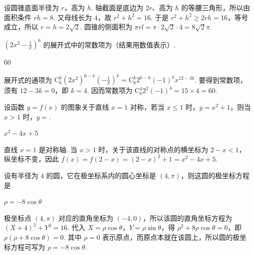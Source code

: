 \begin{solution}
设圆锥底面半径为 \(r\)，高为 \(h\). 轴截面是底边为 \(2r\)、高为 \(h\) 的等腰三角形，所以由面积条件 \(rh=8\). 又母线长为 \(4\)，故 \(r^2+h^2=16\). 于是
\(r^2+h^2\geqslant2rh=16\)，等号成立，所以 \(r=h=2\sqrt2\). 圆锥的侧面积为 \(\pi rl=\pi\cdot2\sqrt2\cdot4=8\sqrt2\pi\).
\end{solution}

\begin{problem}
\(\left(2x^2 - \frac{1}{x}\right)^6\) 的展开式中的常数项为\fillinblank{}（结果用数值表示）.
\end{problem}

\begin{answer}
\(60\)
\end{answer}

\begin{solution}
展开式的通项为
\(\displaystyle\mathrm C_6^k(2x^2)^{6-k}\left(-\frac1x\right)^k=\mathrm C_6^k2^{6-k}(-1)^kx^{12-3k}\). 要得到常数项，须有 \(12-3k=0\)，即 \(k=4\). 因而常数项为
\(\displaystyle\mathrm C_6^4 2^2(-1)^4=15\times4=60\).
\end{solution}

\begin{problem}
设函数 \(y = f(x)\) 的图象关于直线 \(x = 1\) 对称，若当 \(x \leqslant 1\) 时，\(y = x^2 + 1\)，则当 \(x > 1\) 时，\(y = \)\fillinblank{}.
\end{problem}

\begin{answer}
\(x^2 - 4x + 5\)
\end{answer}

\begin{solution}
直线 \(x=1\) 是对称轴. 当 \(x>1\) 时，关于该直线的对称点的横坐标为 \(2-x<1\)，纵坐标不变，因此
\(f(x)=f(2-x)=(2-x)^2+1=x^2-4x+5\).
\end{solution}

\begin{problem}
设有半径为 \(4\) 的圆，它在极坐标系内的圆心坐标是 \((4,\pi)\)，则这圆的极坐标方程是\fillinblank{}.
\end{problem}

\begin{answer}
\(\rho = -8\cos \theta\)
\end{answer}

\begin{solution}
极坐标点 \((4,\pi)\) 对应的直角坐标为 \((-4,0)\)，所以该圆的直角坐标方程为 \((X+4)^2+Y^2=16\). 代入 \(X=\rho\cos\theta\)，\(Y=\rho\sin\theta\)，得
\(\rho^2+8\rho\cos\theta=0\)，即 \(\rho(\rho+8\cos\theta)=0\). 其中 \(\rho=0\) 表示原点，而原点本就在该圆上，所以圆的极坐标方程可写为 \(\rho=-8\cos\theta\).
\end{solution}

